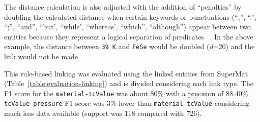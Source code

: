 \documentclass[]{interact}
\theoremstyle{plain}%
\theoremstyle{definition}
\theoremstyle{remark}
\begin{document}
The distance calculation is also adjusted with the addition of ``penalties'' by doubling the calculated distance when certain keywords or punctuations (``,'', ``.'', ``;'', ``and'', ``but', ``while', ``whereas', ``which'', ``although'') appear between two entities because they represent a logical separation of predicates ~\cite{oka2021table}.
In the above example, the distance between \texttt{39 K} and \texttt{FeSe} would be doubled (\textit{d}=20) and the link would not be made.

This rule-based linking was evaluated using the linked entities from SuperMat~\cite{foppiano2021supermat} (Table~\ref{table:evaluation-linking}) and is divided considering each link type.
The F1 score for the \texttt{material-tcValue} was about 80\% with a precision of 88.40\%. 
\texttt{tcValue-pressure} F1 score was 3\% lower than  \texttt{material-tcValue} considering much less data available (support was 118 compared with 726).

\end{document}

